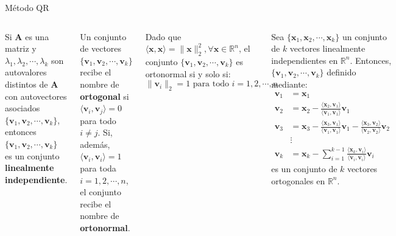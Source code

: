 \documentclass[9pt, aspectratio=169]{beamer}
\begin{document}
\begin{frame}{Método QR}
	\begin{columns}[t]
		\cx
		\begin{theorem}
			Si $\bm{A}$ es una matriz y $\lambda_1, \lambda_2, \cdots, \lambda_k$ son autovalores distintos de $\bm{A}$ con autovectores asociados $\{ \bm{v}_1, \bm{v}_2, \cdots,\bm{v}_k \}$, entonces $\{ \bm{v}_1, \bm{v}_2, \cdots,\bm{v}_k\}$ es un conjunto \textbf{linealmente independiente}.
		\end{theorem} \pause

		\begin{definition}
			Un conjunto de vectores $\{\bm{v}_1, \bm{v}_2, \cdots,\bm{v}_k\}$ recibe el nombre de \textbf{ortogonal} si $\langle \bm{v}_i, \bm{v}_j \rangle = 0$ para todo $i \neq j$. Si, además, $\langle \bm{v}_i, \bm{v}_i \rangle = 1$ para toda $i = 1, 2, \cdots, n$, el conjunto recibe el nombre de \textbf{ortonormal}.
		\end{definition}

		Dado que $\langle \bm{x}, \bm{x} \rangle = \lVert \bm{x} \rVert_2^2, \forall \bm{x} \in \mathbb{R}^n$, el conjunto $\{\bm{v}_1, \bm{v}_2, \cdots,\bm{v}_k\}$ es ortonormal si y solo si:\[ \lVert \bm{v}_i \rVert_2 = 1 \text{ para todo } i = 1, 2, \cdots, n \]
		\pause

		\cx
		\begin{theorem}
			Sea $\{ \bm{x}_1, \bm{x}_2, \cdots, \bm{x}_k \}$ un conjunto de $k$ vectores linealmente independientes en $\mathbb{R}^n$. Entonces, $\{ \bm{v}_1, \bm{v}_2, \cdots, \bm{v}_k \}$ definido mediante:
			\begin{align*}
				\bm{v}_1 & = \bm{x}_1                                                                                                                                                                                       \\
				\bm{v}_2 & = \bm{x}_2 - \frac{\langle \bm{x}_2, \bm{v}_1 \rangle }{\langle \bm{v}_1, \bm{v}_1 \rangle} \bm{v}_1                                                                                             \\
				\bm{v}_3 & = \bm{x}_3 - \frac{\langle \bm{x}_3, \bm{v}_1 \rangle }{\langle \bm{v}_1, \bm{v}_1 \rangle } \bm{v}_1 - \frac{\langle \bm{x}_3, \bm{v}_2 \rangle }{\langle \bm{v}_2, \bm{v}_2 \rangle } \bm{v}_2 \\
				         & \vdots                                                                                                                                                                                           \\
				\bm{v}_k & = \bm{x}_k - \sum_{i=1}^{k-1} \frac{\langle \bm{x}_k, \bm{v}_i \rangle }{\langle \bm{v}_i, \bm{v}_i \rangle } \bm{v}_i
			\end{align*}
			es un conjunto de $k$ vectores ortogonales en $\mathbb{R}^n$.
		\end{theorem}
	\end{columns}
\end{frame}
\end{document}
